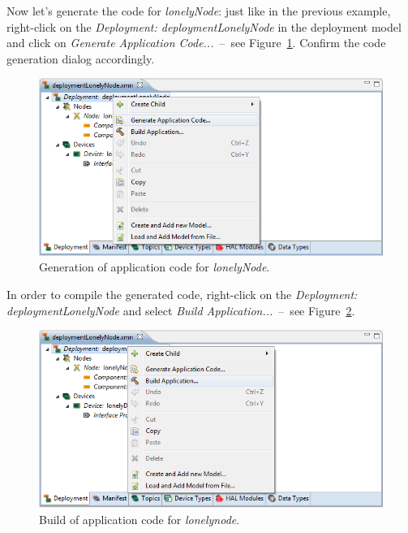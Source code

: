 Now let's generate the code for \emph{lonelyNode}:
just like in the previous example, right-click on the \emph{Deployment: deploymentLonelyNode} in the deployment model
and click on \emph{Generate Application Code...}~--~see Figure~\ref{fig:xmt_deploymentLonely_generate}.
Confirm the code generation dialog accordingly.

\begin{figure}[ht]
	\centering
	\includegraphics[scale=0.5]{figures/xmt_deploymentLonely_generate.png}
	\caption{Generation of application code for \emph{lonelyNode}.}
	\label{fig:xmt_deploymentLonely_generate}
\end{figure}

In order to compile the generated code, right-click on the \emph{Deployment: deploymentLonelyNode}
and select \emph{Build Application...}~--~see Figure~\ref{fig:xmt_deploymentLonely_build}.

\begin{figure}[ht]
	\centering
	\includegraphics[scale=0.5]{figures/xmt_deploymentLonely_build.png}
	\caption{Build of application code for \emph{lonelynode}.}
	\label{fig:xmt_deploymentLonely_build}
\end{figure}

